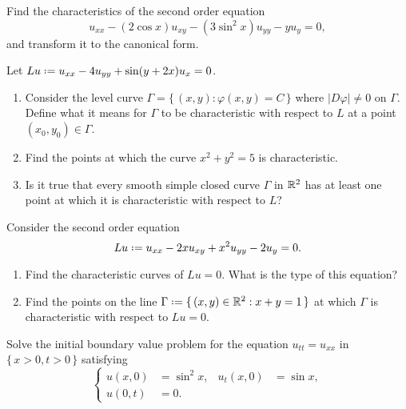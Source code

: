 \begin{problem}
  Find the characteristics of the second order equation
  \[
    u_{xx}-(2\cos x)u_{xy}-(3\sin^2 x)u_{yy}-yu_y=0,
  \]
  and transform it to the canonical form.
\end{problem}
\begin{solution*}
\end{solution*}

\begin{problem}
  Let \(Lu\defeq u_{xx}-4u_{yy}+\sin(y+2x)u_{x}=0\).
  \begin{enumerate}[label=(\alph*),noitemsep]
  \item Consider the level curve \(\Gamma=\{\,(x,y):\varphi(x,y)=C\,\}\)
    where \(|D\varphi|\neq 0\) on \(\Gamma\). Define what it means for
    \(\Gamma\) to be characteristic with respect to \(L\) at a point
    \((x_0,y_0)\in\Gamma\).
  \item Find the points at which the curve \(x^2+y^2=5\) is
    characteristic.
  \item Is it true that every smooth simple closed curve \(\Gamma\) in
    \(\mathbb{R}^2\) has at least one point at which it is characteristic with
    respect to \(L\)?
  \end{enumerate}
\end{problem}
\begin{solution*}
\end{solution*}

\begin{problem}
  Consider the second order equation
  \[
    Lu\defeq u_{xx}-2xu_{xy}+x^2u_{yy}-2u_y=0.
  \]
  \begin{enumerate}[label=(\alph*),noitemsep]
  \item Find the characteristic curves of \(Lu=0\). What is the type of
    this equation?
  \item Find the points on the line
    \(\Gamma\defeq\{\,(x,y)\in\bbR^2:x+y=1\,\}\) at which \(\Gamma\) is
    characteristic with respect to \(Lu=0\).
  \end{enumerate}
\end{problem}
\begin{solution*}
\end{solution*}

\begin{problem}
  Solve the initial boundary value problem for the equation
  \(u_{tt}=u_{xx}\) in \(\{\,x>0,t>0\,\}\) satisfying
    \[
     \left\{
       \begin{aligned}
         u(x,0)&=\sin^2x,&u_t(x,0)&=\sin x,\\
         u(0,t)&=0.
      \end{aligned}
    \right.
  \]
\end{problem}
\begin{solution*}
\end{solution*}

